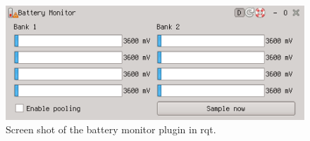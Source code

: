 \begin{figure}[H]
	\centering
	\includegraphics[width=\textwidth]{fig/bm-rqt}
	\caption{Screen shot of the battery monitor plugin in rqt.}
	\label{fig:bm-rqt}
\end{figure}



